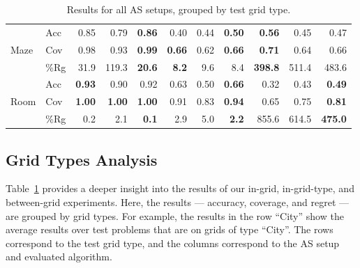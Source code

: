 \documentclass{ecai}
\begin{document}
\begin{table}[bth!]
\begin{tabular}{@{}ll|rrr|rrr|rrr@{}}
\midrule
\multirow{3}{*}{Maze}      & Acc      & 0.85                    & 0.79                    & \textbf{0.86}           & 0.40                    & 0.44                    & \textbf{0.50}           & \textbf{0.56}           & 0.45                    & 0.47                    \\
                           & Cov      & 0.98                    & 0.93                    & \textbf{0.99}           & \textbf{0.66}           & 0.62                    & \textbf{0.66}           & \textbf{0.71}           & 0.64                    & 0.66                    \\
                           & \%Rg     & 31.9                    & 119.3                   & \textbf{20.6}           & \textbf{8.2}            & 9.6                     & 8.4                     & \textbf{398.8}          & 511.4                   & 483.6                   \\
\midrule
\multirow{3}{*}{Room}      & Acc      & \textbf{0.93}           & 0.90                    & 0.92                    & 0.63                    & 0.50                    & \textbf{0.66}           & 0.32                    & 0.43                    & \textbf{0.49}           \\
                           & Cov      & \textbf{1.00}           & \textbf{1.00}           & \textbf{1.00}           & 0.91                    & 0.83                    & \textbf{0.94}           & 0.65                    & 0.75                    & \textbf{0.81}           \\
                           & \%Rg     & 0.2                     & 2.1                     & \textbf{0.1}            & 2.9                     & 5.0                     & \textbf{2.2}            & 855.6                   & 614.5                   & \textbf{475.0}          \\ \bottomrule 
\end{tabular}
\caption{Results for all AS setups, grouped by test grid type.}
\label{tab:by-grid-type}
\end{table}




\subsection{Grid Types Analysis}







Table~\ref{tab:by-grid-type} provides a deeper insight into the results of our in-grid, in-grid-type, and between-grid experiments. 
Here, the results --- accuracy, coverage, and regret --- are grouped by grid types. 
For example, the results in the row ``City'' show the average results over test problems that are on grids of type ``City''. 
The rows correspond to the test grid type, and the columns correspond to the AS setup and evaluated algorithm. 
\end{document}
